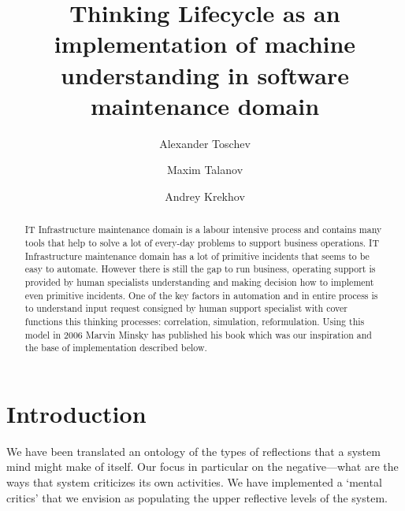 \documentclass[runningheads,a4paper]{llncs}
\begin{document}
\mainmatter

\title{Thinking Lifecycle as an implementation of machine understanding in software maintenance domain}


\author{Alexander Toschev \and Maxim Talanov \and Andrey Krekhov}


\maketitle

\begin{abstract}
IT Infrastructure maintenance domain is a labour intensive process and contains many tools that help to solve a lot of every-day problems to support business operations. IT Infrastructure maintenance domain has a lot of primitive incidents that seems to be easy to automate. However there is still the gap to run business, operating support is provided by human specialists understanding and making decision how to implement even primitive incidents. One of the key factors in automation and in entire process is to understand input request consigned by human support specialist with cover functions this thinking processes:  correlation, simulation, reformulation. Using this model in 2006 Marvin Minsky has published his book \cite{minsk} which was our inspiration and the base of implementation described below.


\end{abstract}

\section{Introduction}
We have been translated an ontology of the types of reflections that a system mind might make of itself. Our focus in particular on the negative—what are the ways that system criticizes its own activities.  We have implemented a ‘mental critics’ that we envision as populating the upper reflective levels of the system. 
\end{document}

